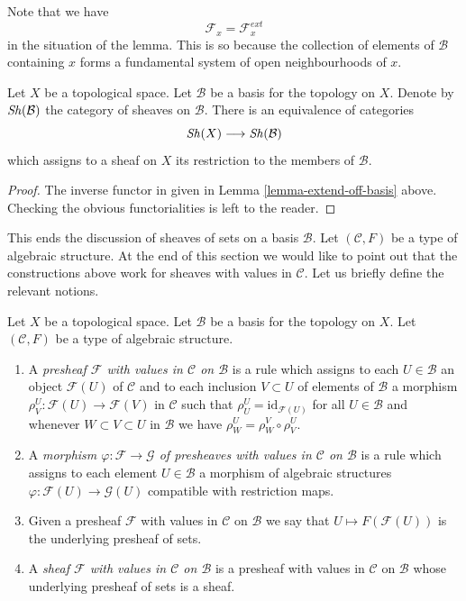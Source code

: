 \noindent
Note that we have
$$
\mathcal{F}_x = \mathcal{F}_x^{ext}
$$
in the situation of the lemma. This is so because the
collection of elements of $\mathcal{B}$ containing
$x$ forms a fundamental system of open neighbourhoods of $x$.

\begin{lemma}
\label{lemma-restrict-basis-equivalence}
Let $X$ be a topological space.
Let $\mathcal{B}$ be a basis for the topology on $X$.
Denote by $\mathop{\mathit{Sh}}\nolimits(\mathcal{B})$ the category of
sheaves on $\mathcal{B}$.
There is an equivalence of categories
$$
\mathop{\mathit{Sh}}\nolimits(X) \longrightarrow \mathop{\mathit{Sh}}\nolimits(\mathcal{B})
$$
which assigns to a sheaf on $X$ its restriction to
the members of $\mathcal{B}$.
\end{lemma}

\begin{proof}
The inverse functor in given in Lemma \ref{lemma-extend-off-basis} above.
Checking the obvious functorialities is left to the
reader.
\end{proof}

\noindent
This ends the discussion of sheaves of sets on
a basis $\mathcal{B}$. Let $(\mathcal{C}, F)$ be
a type of algebraic structure. At the end of this section
we would like to point out that the constructions
above work for sheaves with values in $\mathcal{C}$.
Let us briefly define the relevant notions.

\begin{definition}
\label{definition-sheaf-structures-basis}
Let $X$ be a topological space. Let $\mathcal{B}$ be a
basis for the topology on $X$. Let $(\mathcal{C}, F)$ be
a type of algebraic structure.
\begin{enumerate}
\item A {\it presheaf $\mathcal{F}$ with values in $\mathcal{C}$
on $\mathcal{B}$} is a rule which assigns to each
$U \in \mathcal{B}$ an object
$\mathcal{F}(U)$ of $\mathcal{C}$ and to each inclusion $V \subset U$
of elements of $\mathcal{B}$ a morphism
$\rho^U_V : \mathcal{F}(U) \to \mathcal{F}(V)$ in $\mathcal{C}$ such that
$\rho^U_U = \text{id}_{\mathcal{F}(U)}$ for all $U \in \mathcal{B}$ and
whenever $W \subset V \subset U$ in $\mathcal{B}$ we have
$\rho^U_W = \rho^V_W \circ \rho ^U_V$.
\item A {\it morphism $\varphi : \mathcal{F} \to \mathcal{G}$
of presheaves with values in $\mathcal{C}$
on $\mathcal{B}$} is a rule which assigns to each
element $U \in \mathcal{B}$ a morphism of
algebraic structures $\varphi : \mathcal{F}(U) \to \mathcal{G}(U)$
compatible with restriction maps.
\item Given a presheaf $\mathcal{F}$ with values in $\mathcal{C}$
on $\mathcal{B}$ we say that $U \mapsto F(\mathcal{F}(U))$ is the
underlying presheaf of sets.
\item A {\it sheaf $\mathcal{F}$ with values in $\mathcal{C}$
on $\mathcal{B}$} is a presheaf with values in $\mathcal{C}$
on $\mathcal{B}$ whose underlying presheaf of sets is a sheaf.
\end{enumerate}
\end{definition}

